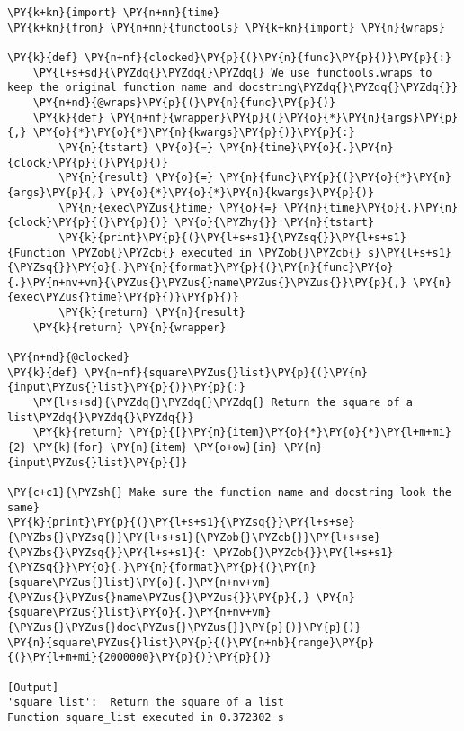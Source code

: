 \begin{Verbatim}[label=\makebox{\url{https://github.com/lucabaldini/cmepda/tree/master/slides/latex/snippets/time\_measuring\_decor.py}},commandchars=\\\{\}]
\PY{k+kn}{import} \PY{n+nn}{time} 
\PY{k+kn}{from} \PY{n+nn}{functools} \PY{k+kn}{import} \PY{n}{wraps}

\PY{k}{def} \PY{n+nf}{clocked}\PY{p}{(}\PY{n}{func}\PY{p}{)}\PY{p}{:}
    \PY{l+s+sd}{\PYZdq{}\PYZdq{}\PYZdq{} We use functools.wraps to keep the original function name and docstring\PYZdq{}\PYZdq{}\PYZdq{}}
    \PY{n+nd}{@wraps}\PY{p}{(}\PY{n}{func}\PY{p}{)}
    \PY{k}{def} \PY{n+nf}{wrapper}\PY{p}{(}\PY{o}{*}\PY{n}{args}\PY{p}{,} \PY{o}{*}\PY{o}{*}\PY{n}{kwargs}\PY{p}{)}\PY{p}{:}
        \PY{n}{tstart} \PY{o}{=} \PY{n}{time}\PY{o}{.}\PY{n}{clock}\PY{p}{(}\PY{p}{)}
        \PY{n}{result} \PY{o}{=} \PY{n}{func}\PY{p}{(}\PY{o}{*}\PY{n}{args}\PY{p}{,} \PY{o}{*}\PY{o}{*}\PY{n}{kwargs}\PY{p}{)}
        \PY{n}{exec\PYZus{}time} \PY{o}{=} \PY{n}{time}\PY{o}{.}\PY{n}{clock}\PY{p}{(}\PY{p}{)} \PY{o}{\PYZhy{}} \PY{n}{tstart}
        \PY{k}{print}\PY{p}{(}\PY{l+s+s1}{\PYZsq{}}\PY{l+s+s1}{Function \PYZob{}\PYZcb{} executed in \PYZob{}\PYZcb{} s}\PY{l+s+s1}{\PYZsq{}}\PY{o}{.}\PY{n}{format}\PY{p}{(}\PY{n}{func}\PY{o}{.}\PY{n+nv+vm}{\PYZus{}\PYZus{}name\PYZus{}\PYZus{}}\PY{p}{,} \PY{n}{exec\PYZus{}time}\PY{p}{)}\PY{p}{)}
        \PY{k}{return} \PY{n}{result}
    \PY{k}{return} \PY{n}{wrapper}

\PY{n+nd}{@clocked}
\PY{k}{def} \PY{n+nf}{square\PYZus{}list}\PY{p}{(}\PY{n}{input\PYZus{}list}\PY{p}{)}\PY{p}{:}
    \PY{l+s+sd}{\PYZdq{}\PYZdq{}\PYZdq{} Return the square of a list\PYZdq{}\PYZdq{}\PYZdq{}}
    \PY{k}{return} \PY{p}{[}\PY{n}{item}\PY{o}{*}\PY{o}{*}\PY{l+m+mi}{2} \PY{k}{for} \PY{n}{item} \PY{o+ow}{in} \PY{n}{input\PYZus{}list}\PY{p}{]}

\PY{c+c1}{\PYZsh{} Make sure the function name and docstring look the same}
\PY{k}{print}\PY{p}{(}\PY{l+s+s1}{\PYZsq{}}\PY{l+s+se}{\PYZbs{}\PYZsq{}}\PY{l+s+s1}{\PYZob{}\PYZcb{}}\PY{l+s+se}{\PYZbs{}\PYZsq{}}\PY{l+s+s1}{: \PYZob{}\PYZcb{}}\PY{l+s+s1}{\PYZsq{}}\PY{o}{.}\PY{n}{format}\PY{p}{(}\PY{n}{square\PYZus{}list}\PY{o}{.}\PY{n+nv+vm}{\PYZus{}\PYZus{}name\PYZus{}\PYZus{}}\PY{p}{,} \PY{n}{square\PYZus{}list}\PY{o}{.}\PY{n+nv+vm}{\PYZus{}\PYZus{}doc\PYZus{}\PYZus{}}\PY{p}{)}\PY{p}{)}
\PY{n}{square\PYZus{}list}\PY{p}{(}\PY{n+nb}{range}\PY{p}{(}\PY{l+m+mi}{2000000}\PY{p}{)}\PY{p}{)}

[Output]
'square_list':  Return the square of a list
Function square_list executed in 0.372302 s
\end{Verbatim}
